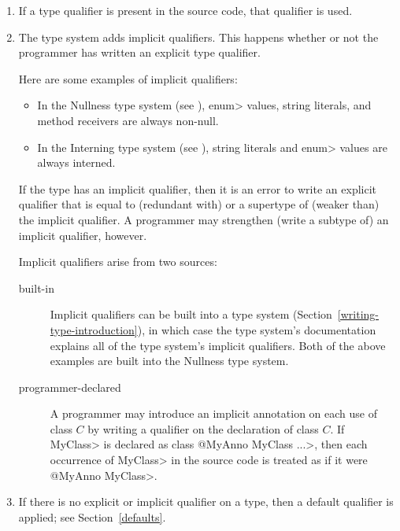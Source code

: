 \begin{enumerate}
\item
  If a type qualifier is present in the source code, that qualifier is used.

\item
  The type system adds implicit qualifiers.  This happens whether or not
  the programmer has written an explicit type qualifier.

  Here are some examples of implicit qualifiers:

\begin{itemize}
\item
  In the Nullness type system (see ),
  \<enum> values, string literals, and method receivers are always non-null.
\item
  In the Interning type system (see ),
  string literals and \<enum> values are always interned.
\end{itemize}

  If the type has an implicit qualifier, then it is an error to write an
  explicit qualifier that is equal to (redundant with) or a supertype of
  (weaker than) the implicit qualifier.  A programmer may strengthen
  (write a subtype of) an implicit qualifier, however.

  Implicit qualifiers arise from two sources:
\begin{description}
\item[built-in]
  Implicit qualifiers can be
  built into a type system (Section~\ref{writing-type-introduction}), in
  which case the type system's documentation explains all of the type
  system's implicit qualifiers.  Both of the above examples are built into
  the Nullness type system.
\item[programmer-declared]
  A programmer may introduce an implicit annotation on each use of class
  $C$ by writing a qualifier on the declaration of class $C$.  If \<MyClass>
  is declared as \<class @MyAnno MyClass \ttlcb...\ttrcb>, then each occurrence of
  \<MyClass> in the source code is treated as if it were \<@MyAnno
  MyClass>.
\end{description}



\item
  If there is no explicit or implicit qualifier on a type, then a default
  qualifier
  is applied; see Section~\ref{defaults}.


\end{enumerate}
